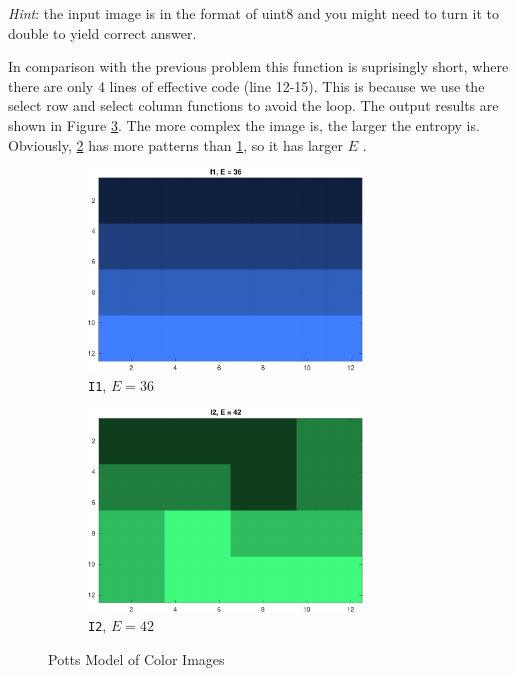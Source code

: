 \emph{Hint}: the input image is in the format of uint8 and you might need to turn it to double to yield correct answer.




In comparison with the previous problem this function is suprisingly short, where there are only 4 lines of effective code (line 12-15).
This is because we use the select row and select column functions to avoid the loop.
The output results are shown in Figure \ref{fig:3}.
The more complex the image is, the larger the entropy is.
Obviously, \ref{fig:3b} has more patterns than \ref{fig:3a}, so it has larger \(E\) .

\begin{figure}[htbp]
	\centering
	\begin{subfigure}[t]{\textwidth}
	    \centering
		\includegraphics[width=0.8\textwidth]{hw1/problem4/i1.pdf}
		\caption{\texttt{I1}, \(E=36\)}\label{fig:3a}
	\end{subfigure}
	\begin{subfigure}[t]{\textwidth}
	    \centering
		\includegraphics[width=0.8\textwidth]{hw1/problem4/i2.pdf}
		\caption{\texttt{I2}, \(E=42\)}\label{fig:3b}
	\end{subfigure}
	\caption{Potts Model of Color Images}\label{fig:3}
\end{figure}